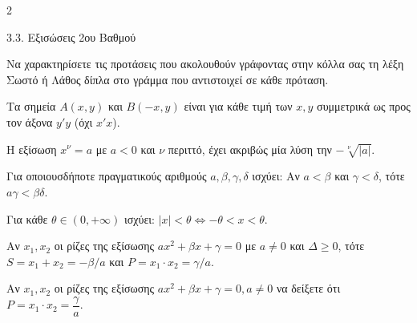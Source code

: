 \begin{ylh}{2}
    \item 3.3. Εξισώσεις 2ου Βαθμού
\end{ylh}
\begin{alist}
\item Να χαρακτηρίσετε τις προτάσεις που ακολουθούν γράφοντας στην κόλλα σας τη λέξη Σωστό ή Λάθος δίπλα στο γράμμα που αντιστοιχεί σε κάθε πρόταση.

\begin{rlist}
\item Τα σημεία $A(x, y)$ και $B(-x, y)$ είναι για κάθε τιμή των $x, y$ συμμετρικά ως προς τον άξονα $y'y$ (όχι $x'x$).
\item Η εξίσωση $x^\nu = a$ με $a < 0$ και $\nu$ περιττό, έχει ακριβώς μία λύση την $-\sqrt[\nu]{|a|}$.
\item Για οποιουσδήποτε πραγματικούς αριθμούς $a, \beta, \gamma, \delta$ ισχύει: Αν $a < \beta$ και $\gamma < \delta$, τότε $a\gamma < \beta\delta$.
\item Για κάθε $\theta \in (0, +\infty)$ ισχύει: $|x| < \theta \Leftrightarrow -\theta < x < \theta$.
\item Αν $x_1, x_2$ οι ρίζες της εξίσωσης $a x^2 + \beta x + \gamma = 0$ με $a \neq 0$ και $\Delta \ge 0$, τότε $S = x_1 + x_2 = -\beta/a$ και $P = x_1 \cdot x_2 = \gamma/a$.
\end{rlist}
\item Αν $x_1, x_2$ οι ρίζες της εξίσωσης $a x^2 + \beta x + \gamma = 0, a \neq 0$ να δείξετε ότι $P = x_1 \cdot x_2 = \dfrac{\gamma}{a}$. 
\end{alist}

